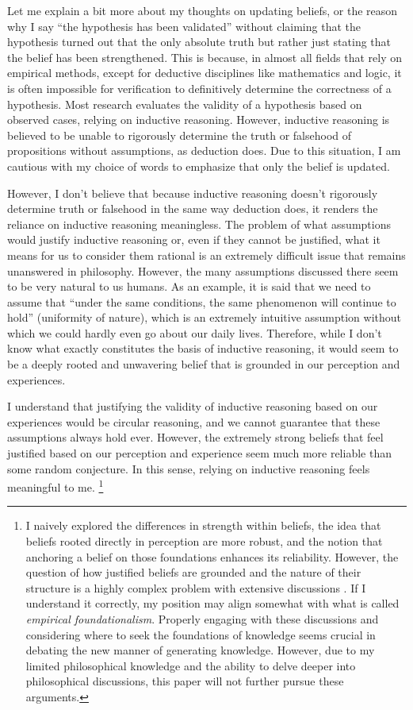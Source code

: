 \documentclass{book}
\begin{document}
Let me explain a bit more about my thoughts on updating beliefs, or the reason why I say ``the hypothesis has been validated'' without claiming that the hypothesis turned out that the only absolute truth but rather just stating that the belief has been strengthened. This is because, in almost all fields that rely on empirical methods, except for deductive disciplines like mathematics and logic, it is often impossible for verification to definitively determine the correctness of a hypothesis. Most research evaluates the validity of a hypothesis based on observed cases, relying on inductive reasoning. However, inductive reasoning is believed to be unable to rigorously determine the truth or falsehood of propositions without assumptions, as deduction does. Due to this situation, I am cautious with my choice of words to emphasize that only the belief is updated.

However, I don't believe that because inductive reasoning doesn't rigorously determine truth or falsehood in the same way deduction does, it renders the reliance on inductive reasoning meaningless. The problem of what assumptions would justify inductive reasoning or, even if they cannot be justified, what it means for us to consider them rational is an extremely difficult issue that remains unanswered in philosophy. However, the many assumptions discussed there seem to be very natural to us humans. As an example, it is said that we need to assume that ``under the same conditions, the same phenomenon will continue to hold'' (uniformity of nature), which is an extremely intuitive assumption without which we could hardly even go about our daily lives. Therefore, while I don't know what exactly constitutes the basis of inductive reasoning, it would seem to be a deeply rooted and unwavering belief that is grounded in our perception and experiences.

I understand that justifying the validity of inductive reasoning based on our experiences would be circular reasoning, and we cannot guarantee that these assumptions always hold ever. However, the extremely strong beliefs that feel justified based on our perception and experience seem much more reliable than some random conjecture. In this sense, relying on inductive reasoning feels meaningful to me. \footnote{I naively explored the differences in strength within beliefs, the idea that beliefs rooted directly in perception are more robust, and the notion that anchoring a belief on those foundations enhances its reliability. However, the question of how justified beliefs are grounded and the nature of their structure is a highly complex problem with extensive discussions  \cite{sep-epistemology}. If I understand it correctly, my position may align somewhat with what is called \textit{empirical foundationalism}. Properly engaging with these discussions and considering where to seek the foundations of knowledge seems crucial in debating the new manner of generating knowledge. However, due to my limited philosophical knowledge and the ability to delve deeper into philosophical discussions, this paper will not further pursue these arguments.}
\end{document}
